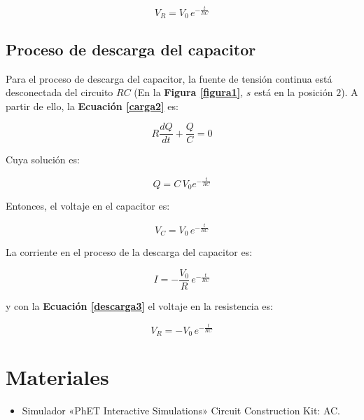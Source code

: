 \documentclass[letter,11pt]{article}
\begin{document}
\begin{equation*}
    V_R = V_0\,e^{-\frac{t}{RC}}
\end{equation*}
\vspace{-0.1cm}

\subsection{Proceso de descarga del capacitor}
Para el proceso de descarga del capacitor, la fuente de tensión continua está
desconectada del circuito $RC$ (En la \textbf{Figura \ref{figura1}}, $s$ está en
la posición $2$). A partir de ello, la \textbf{Ecuación \ref{carga2}} es:

\begin{equation}
    R \frac{dQ}{dt} + \frac{Q}{C} = 0
\label{descarga1}
\end{equation}
\vspace{-0.1cm}

Cuya solución es:

\begin{equation*}
    Q = C\,V_0 e^{-\frac{t}{RC}}
\end{equation*}
\vspace{-0.1cm}

Entonces, el voltaje en el capacitor es:

\begin{equation}
    V_C = V_0\,e^{-\frac{t}{RC}}
\label{descarga2}
\end{equation}
\vspace{-0.1cm}

La corriente en el proceso de la descarga del capacitor es:

\begin{equation}
    I = -\frac{V_0}{R}\,e^{-\frac{t}{RC}}
\label{descarga3}
\end{equation}
\vspace{-0.1cm}

y con la \textbf{Ecuación \ref{descarga3}} el voltaje en la resistencia es:

\begin{equation*}
    V_R = -V_0\,e^{-\frac{t}{RC}}
\end{equation*}
\vspace{-0.1cm}

\section{Materiales}
\begin{itemize}
\item Simulador «PhET Interactive Simulations» Circuit Construction Kit: AC.
\end{itemize}
\end{document}
